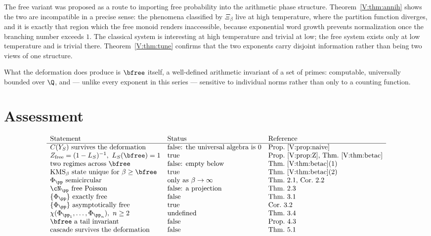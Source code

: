 \begin{remark}\label{V:rem:moral}
The free variant was proposed as a route to importing free probability into the arithmetic
phase structure. Theorem~\ref{V:thm:annih} shows the two are incompatible in a precise sense:
the phenomena classified by $\Xi_\beta$ live at high temperature, where the partition
function diverges, and it is exactly that region which the free monoid renders inaccessible,
because exponential word growth prevents normalization once the branching number exceeds
$1$. The classical system is interesting at high temperature and trivial at low; the free
system exists only at low temperature and is trivial there. Theorem~\ref{V:thm:tune} confirms
that the two exponents carry disjoint information rather than being two views of one
structure.

What the deformation does produce is $\bfree$ itself, a well-defined arithmetic invariant of
a set of primes: computable, universally bounded over $\Q$, and --- unlike every exponent in
this series --- sensitive to individual norms rather than only to a counting function.
\end{remark}

\section{Assessment}

\[
\begin{array}{lll}
\text{Statement} & \text{Status} & \text{Reference}\\\hline
C(Y_S)\ \text{survives the deformation} & \text{false: the universal algebra is }0 & \text{Prop.~\ref{V:prop:naive}}\\
Z_{\mathrm{free}}=(1-L_S)^{-1},\ L_S(\bfree)=1 & \text{true} & \text{Prop.~\ref{V:prop:Z}, Thm.~\ref{V:thm:betac}}\\
\text{two regimes across }\bfree & \text{false: empty below} & \text{Thm.~\ref{V:thm:betac}(1)}\\
\text{KMS}_\beta\text{ state unique for }\beta\ge\bfree & \text{true} & \text{Thm.~\ref{V:thm:betac}(2)}\\
\Phi_\pp\ \text{semicircular} & \text{only as }\beta\to\infty & \text{Thm.~2.1, Cor.~2.2}\\
\cN_\pp\ \text{free Poisson} & \text{false: a projection} & \text{Thm.~2.3}\\
\{\Phi_\pp\}\ \text{exactly free} & \text{false} & \text{Thm.~3.1}\\
\{\Phi_\pp\}\ \text{asymptotically free} & \text{true} & \text{Cor.~3.2}\\
\chi(\Phi_{\pp_1},\dots,\Phi_{\pp_n}),\ n\ge2 & \text{undefined} & \text{Thm.~3.4}\\
\bfree\ \text{a tail invariant} & \text{false} & \text{Prop.~4.3}\\
\text{cascade survives the deformation} & \text{false} & \text{Thm.~5.1}
\end{array}
\]

